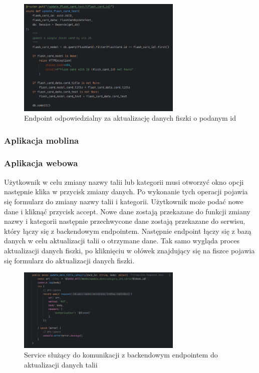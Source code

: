 \begin{figure}[H]
    \centering
    \includegraphics[width=0.7\textwidth]{chapters/chapter_8/screens/update_flash_card_text_backend}
    \caption{Endpoint odpowiedzialny za aktualizację danych fiszki o podanym id}
    \label{img:update_flash_card_backend}
\end{figure}

\subsubsection{Aplikacja moblina}
\subsubsection{Aplikacja webowa}

Użytkownik w celu zmiany nazwy talii lub kategorii musi otworzyć okno opcji następnie klika w przycisk zmiany danych. Po wykonanie tych operacji pojawia się formularz do zmiany nazwy talii i kategorii. Użytkownik może podać nowe dane i kliknąć przycisk accept. Nowe dane zostają przekazane do funkcji zmiany nazwy i kategorii następnie przechwycone dane zostają przekazane do serwisu, który łączy się z backendowym endpointem. Następnie endpoint łączy się z bazą danych w celu aktualizacji talii o otrzymane dane. Tak samo wygląda proces aktualizacji danych fiszki, po kliknięciu w ołówek znajdujący się na fiszce pojawia się formularz do aktualizacji danych fiszki.

\begin{figure}[H]
    \centering
    \includegraphics[width=0.7\textwidth]{chapters/chapter_8/screens/update_deck_web}
    \caption{Service służący do komunikacji z backendowym endpointem do aktualizacji danych talii}
    \label{img:update_deck_web}
\end{figure}

